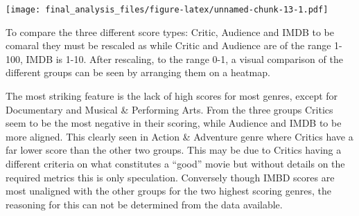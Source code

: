 \documentclass[]{article}
\newenvironment{Shaded}{\begin{snugshade}}{\end{snugshade}}
\newcommand{\DataTypeTok}[1]{\textcolor[rgb]{0.13,0.29,0.53}{#1}}
\newcommand{\DecValTok}[1]{\textcolor[rgb]{0.00,0.00,0.81}{#1}}
\newcommand{\FloatTok}[1]{\textcolor[rgb]{0.00,0.00,0.81}{#1}}
\newcommand{\KeywordTok}[1]{\textcolor[rgb]{0.13,0.29,0.53}{\textbf{#1}}}
\newcommand{\NormalTok}[1]{#1}
\newcommand{\OperatorTok}[1]{\textcolor[rgb]{0.81,0.36,0.00}{\textbf{#1}}}
\newcommand{\StringTok}[1]{\textcolor[rgb]{0.31,0.60,0.02}{#1}}
\begin{document}
\begin{Shaded}
\end{Shaded}

\texttt{[image: final\_analysis\_files/figure-latex/unnamed-chunk-13-1.pdf]}

To compare the three different score types: Critic, Audience and IMDB to
be comaral they must be rescaled as while Critic and Audience are of the
range 1-100, IMDB is 1-10. After rescaling, to the range 0-1, a visual
comparison of the different groups can be seen by arranging them on a
heatmap.

The most striking feature is the lack of high scores for most genres,
except for Documentary and Musical \& Performing Arts. From the three
groups Critics seem to be the most negative in their scoring, while
Audience and IMDB to be more aligned. This clearly seen in Action \&
Adventure genre where Critics have a far lower score than the other two
groups. This may be due to Critics having a different criteria on what
constitutes a ``good'' movie but without details on the required metrics
this is only speculation. Conversely though IMBD scores are most
unaligned with the other groups for the two highest scoring genres, the
reasoning for this can not be determined from the data available.
\end{document}
